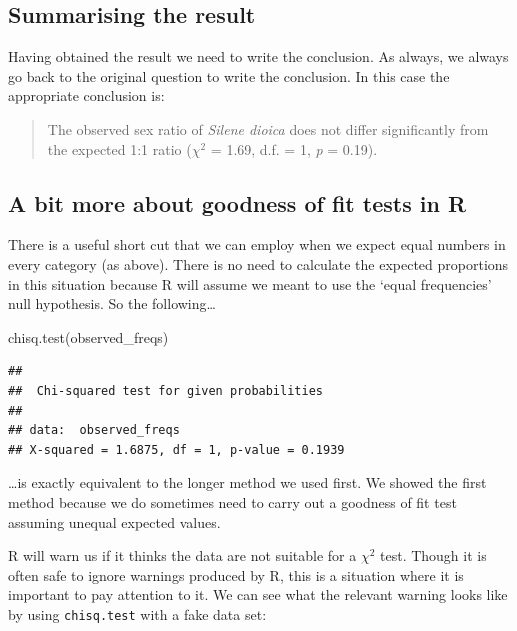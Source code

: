 \documentclass[
]{book}
\newenvironment{Shaded}{\begin{snugshade}}{\end{snugshade}}
\newcommand{\FunctionTok}[1]{\textcolor[rgb]{0.00,0.00,0.00}{#1}}
\newcommand{\NormalTok}[1]{#1}
\begin{document}
\hypertarget{summarising-the-result-2}{%
\subsection{Summarising the result}\label{summarising-the-result-2}}

Having obtained the result we need to write the conclusion. As always, we always go back to the original question to write the conclusion. In this case the appropriate conclusion is:

\begin{quote}
The observed sex ratio of \emph{Silene dioica} does not differ significantly from the expected 1:1 ratio (\(\chi^{2}\) = 1.69, d.f. = 1, \emph{p} = 0.19).
\end{quote}

\hypertarget{a-bit-more-about-goodness-of-fit-tests-in-r}{%
\subsection{A bit more about goodness of fit tests in R}\label{a-bit-more-about-goodness-of-fit-tests-in-r}}

There is a useful short cut that we can employ when we expect equal numbers in every category (as above). There is no need to calculate the expected proportions in this situation because R will assume we meant to use the `equal frequencies' null hypothesis. So the following\ldots{}

\begin{Shaded}
\begin{Highlighting}[]
\FunctionTok{chisq.test}\NormalTok{(observed\_freqs)}
\end{Highlighting}
\end{Shaded}

\begin{verbatim}
## 
##  Chi-squared test for given probabilities
## 
## data:  observed_freqs
## X-squared = 1.6875, df = 1, p-value = 0.1939
\end{verbatim}

\ldots is exactly equivalent to the longer method we used first. We showed the first method because we do sometimes need to carry out a goodness of fit test assuming unequal expected values.

R will warn us if it thinks the data are not suitable for a \(\chi^{2}\) test. Though it is often safe to ignore warnings produced by R, this is a situation where it is important to pay attention to it. We can see what the relevant warning looks like by using \texttt{chisq.test} with a fake data set:
\end{document}
